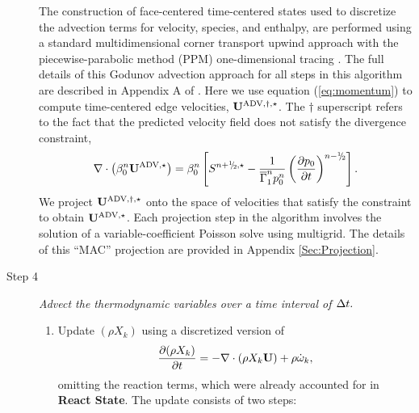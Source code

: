 \begin{description}
The construction of face-centered time-centered states used to discretize the
advection terms for velocity, species, and enthalpy, are performed using
a standard multidimensional corner transport upwind approach
\citep{colella1990multidimensional,saltzman1994unsplit} with the piecewise-parabolic method (PPM)
one-dimensional tracing \citep{colella1984piecewise}.  The full details of this
Godunov advection approach for all steps in this algorithm are described 
in Appendix A of \cite{XRB_III}.
Here we use equation (\ref{eq:momentum}) to compute time-centered edge velocities, ${\bf{U}}^{\mathrm{ADV},\dagger,\star}$.
The $\dagger$ superscript refers to the fact that the predicted velocity field does not satisfy the divergence constraint,
\begin{equation}
\nabla \cdot \left(\beta_0^n \uadvone\right) = \beta_0^n \left[S^{\nph,\star} - \frac{1}{\gammaonebar^np_0^n}\left(\frac{\partial p_0}{\partial t}\right)^{n-\myhalf} \right].\label{eq:div1}
\end{equation}
 We project ${\bf{U}}^{\mathrm{ADV},\dagger,\star}$ onto the space of velocities that satisfy the constraint to obtain ${\bf{U}}^{\mathrm{ADV},\star}$.
Each projection step in the algorithm involves the solution of a variable-coefficient Poisson solve using multigrid.
The details of this ``MAC'' projection are provided in Appendix \ref{Sec:Projection}.

\item[Step 4] {\em Advect the thermodynamic variables over a time interval of $\Delta t.$}

\begin{enumerate}
\renewcommand{\theenumi}{{\bf \Alph{enumi}}}

\item Update $(\rho X_k)$ using a discretized version of
%
\begin{equation}
\frac{\partial(\rho X_k)}{\partial t} = -\nabla\cdot(\rho X_k\Ub) + \rho\omegadot_k,
\end{equation}
%
omitting the reaction terms, which were already 
accounted for in {\bf React State}.  The update consists of two steps:

\begin{enumerate}
\renewcommand{\labelenumii}{{\bf \roman{enumii}}.}


\end{enumerate}
\end{enumerate}
\end{description}
